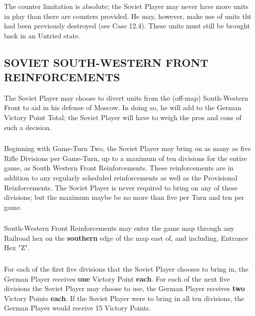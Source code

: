 \subsubsection{} The counter limitation is absolute; the Soviet Player may never have more units in play than there are counters provided. He may, however, make use of units tht had been previously destroyed (see Case 12.4). These units must still be brought back in an Untried state.

\subsection{SOVIET SOUTH-WESTERN FRONT REINFORCEMENTS}

The Soviet Player may choose to divert units from the (off-map) South-Western Front to aid in his defense of Moscow. In doing so, he will add to the German Victory Point Total; the Soviet Player will have to weigh the pros and cons of such a decision.

\subsubsection{} Beginning with Game-Turn Two, the Soviet Player may bring on as many as five Rifle Divisions per Game-Turn, up to a maximum of ten divisions for the entire game, as South Western Front Reinforcements. These reinforcements are in addition to any regularly scheduled reinforcements as well as the Provisional Reinforcements. The Soviet Player is never required to bring on any of these divisions; but the maximum maybe be no more than five per Turn and ten per game.

\subsubsection{} South-Western Front Reinforcements may enter the game map through any Railroad hex on the \textbf{southern} edge of the map east of, and including, Entrance Hex "Z".

\subsubsection{} For each of the first five divisions that the Soviet Player chooses to bring in, the German Player receives \textbf{one} Victory Point \textbf{each}. For each of the next five divisions the Soviet Player may choose to use, the German Player receives \textbf{two} Victory Points \textbf{each}. If the Soviet Player were to bring in all ten divisions, the German Player would receive 15 Victory Points.

